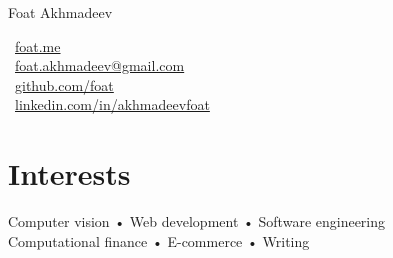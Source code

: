 \documentclass[10pt, a4paper]{article}
\makeatletter
\def\myauthor{Foat Akhmadeev}
\def\myemail{foat.akhmadeev@gmail.com}
\def\mygithub{github.com/foat}
\def\mylinkedin{linkedin.com/in/akhmadeevfoat}
\def\myhomesite{foat.me}
\makeatother
\begin{document}
{\LARGE \myauthor}\\[1cm]
\begin{minipage}[t]{2in}
\end{minipage}
\begin{minipage}[t]{4in}
\flushleft
\faHome \, \href{http://\myhomesite}{\myhomesite}\\
\faEnvelopeAlt \, \href{mailto:\myemail}{\myemail}\\
\faGithub \, \href{https://\mygithub}{\mygithub}\\
\faLinkedin \, \href{https://\mylinkedin}{\mylinkedin}\\
\end{minipage}

\section*{Interests}
Computer vision • Web development • Software engineering\\
Computational finance • E-commerce • Writing
\end{document}
